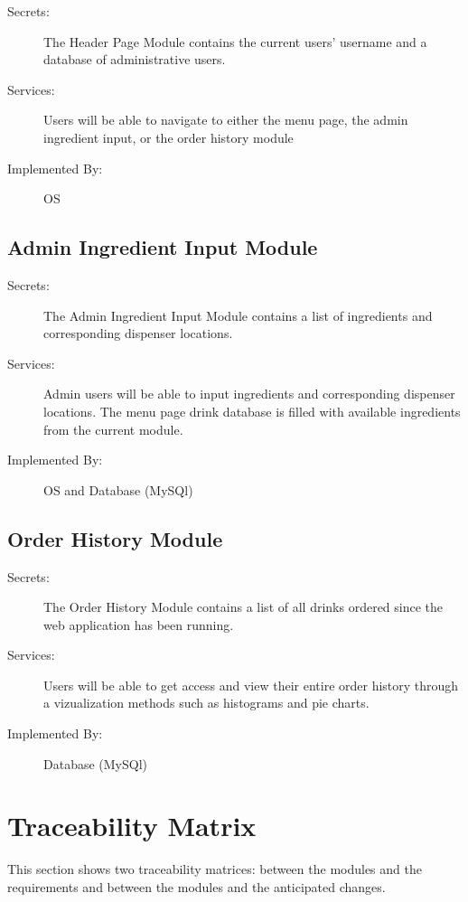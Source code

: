 \documentclass[12pt, titlepage]{article}
\begin{document}
\begin{description}
\item[Secrets:] The Header Page Module contains the current users' username and a database of administrative users.
\item[Services:] Users will be able to navigate to either the menu page, the admin ingredient input, or the order history module
\item[Implemented By:] OS
\end{description}

\subsection{Admin Ingredient Input Module}

\begin{description}
\item[Secrets:] The Admin Ingredient Input Module contains a list of ingredients and corresponding dispenser locations.
\item[Services:] Admin users will be able to input ingredients and corresponding dispenser locations. The menu page drink database is filled with available ingredients from the current module.
\item[Implemented By:] OS and Database (MySQl)
\end{description}

\subsection{Order History Module}

\begin{description}
\item[Secrets:] The Order History Module contains a list of all drinks ordered since the web application has been running.
\item[Services:] Users will be able to get access and view their entire order history through a vizualization methods such as histograms and pie charts.
\item[Implemented By:] Database (MySQl)
\end{description}


\section{Traceability Matrix} \label{SecTM}

This section shows two traceability matrices: between the modules and the
requirements and between the modules and the anticipated changes.
\end{document}
